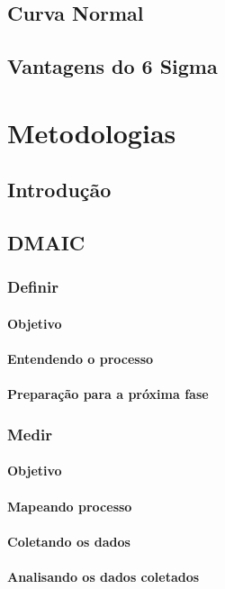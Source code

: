 \documentclass{abnt}
\begin{document}
		\section {Curva Normal} 
		    
		\section {Vantagens do 6 Sigma}
				
	\chapter {Metodologias}
		\section {Introdução}
			\section {DMAIC}
				\subsection {Definir}
					\subsubsection {Objetivo}
					\subsubsection {Entendendo o processo}
					\subsubsection {Preparação para a próxima fase}
				\subsection {Medir}
					\subsubsection {Objetivo}
					\subsubsection {Mapeando processo}
					\subsubsection {Coletando os dados}
					\subsubsection {Analisando os dados coletados}
\end{document}
